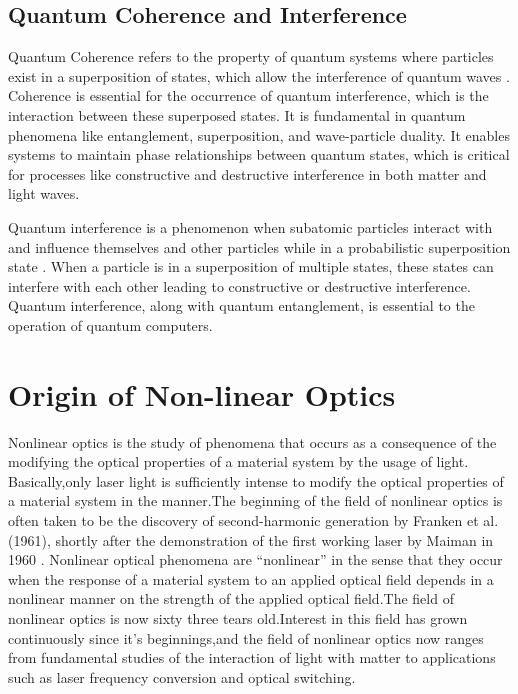 \documentclass[12pt,a4paper]{article}
\begin{document}
\subsection{Quantum Coherence and Interference}
Quantum Coherence refers to the property of quantum systems where particles exist in a superposition of states, which allow the interference of quantum waves \cite{Scully_Zubairy_1997}. Coherence is essential for the occurrence of quantum interference, which is the interaction between these superposed states. It is fundamental in quantum phenomena like entanglement, superposition, and wave-particle duality. It enables systems to maintain phase relationships between quantum states, which is critical for processes like constructive and destructive interference in both matter and light waves.\par
Quantum interference is a phenomenon when subatomic particles interact with and influence themselves and other particles while in a probabilistic superposition state \cite{Scully_Zubairy_1997}. When a particle is in a superposition of multiple states, these states can interfere with each other leading to constructive or destructive interference. Quantum interference, along with quantum entanglement, is essential to the operation of quantum computers.

\section{Origin of Non-linear Optics}
Nonlinear optics is the study of phenomena that occurs as a consequence of the modifying the optical properties of a material system by the usage of light. Basically,only laser light is sufficiently intense to modify the optical properties of a material system in the manner.The beginning of the field of nonlinear optics is often taken to be the discovery of second-harmonic generation by Franken et al. \cite{PhysRevLett.7.118} (1961), shortly after the demonstration of the first working laser by Maiman in 1960 \cite{laserdev}. Nonlinear optical phenomena are “nonlinear” in the sense that they occur when the response of a material system to an applied optical field depends in a nonlinear manner on the strength of the applied optical field.The field of nonlinear optics is now sixty three tears old.Interest in this field has grown continuously since it’s beginnings,and the field of nonlinear optics now ranges from fundamental studies of the interaction of light with matter \cite{lightmatter2022} to applications such as laser frequency conversion and
optical switching.
\end{document}
